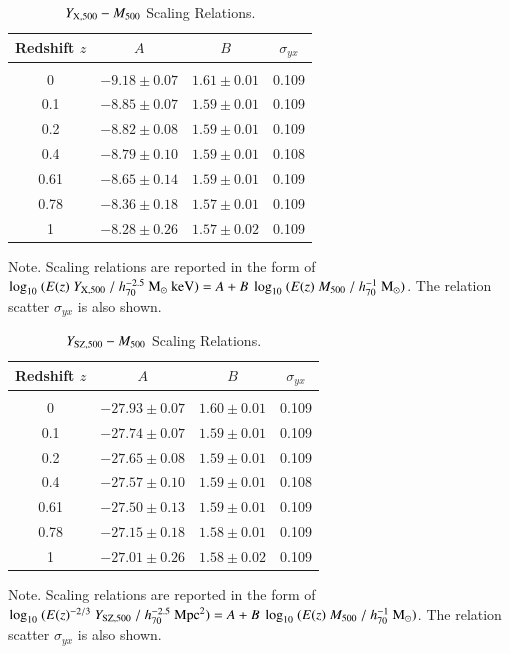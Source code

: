 \documentclass[traditabstract]{aa}
\newcommand{\rmn}{\mathrm}
\begin{document}
\begin{table}[t]
\begin{center}
\caption{$Y_{\rm{X}, 500}-M_{500}$ Scaling Relations.}
\medskip
\begin{tabular}{cccc}
\hline
\phantom{\Big|}
Redshift $z$ & $A$ & $B$ & $\sigma_{yx}$ \\
\hline\\[-0.5em]
 0      & $-9.18\pm0.07$ & $1.61\pm0.01$ & 0.109\\
 0.1   & $-8.85\pm0.07$ & $1.59\pm0.01$ & 0.109\\
 0.2   & $-8.82\pm0.08$ & $1.59\pm0.01$ & 0.109\\ 
 0.4   & $-8.79\pm0.10$ & $1.59\pm0.01$ & 0.108\\ 
 0.61 & $-8.65\pm0.14$ & $1.59\pm0.01$ & 0.109\\ 
 0.78 & $-8.36\pm0.18$ & $1.57\pm0.01$ & 0.109\\ 
 1      & $-8.28\pm0.26$ & $1.57\pm0.02$ & 0.109\\[0.5em]  
\hline
\end{tabular}
\label{tab:YXfits}
\end{center}
\footnotesize{Note. Scaling relations are reported in the form of $\log_{10}~(E(z)~Y_{\rm{X},500}~/~h_{70}^{-2.5}~\rmn{M_{\odot}}~\rmn{keV})=A+B~\log_{10}~(E(z)~M_{500}~/~h_{70}^{-1}~\rmn{M_{\odot}})$. The relation scatter $\sigma_{yx}$ is also shown.}
\end{table}

\begin{table}[t]
\begin{center}
\caption{$Y_{\rm{SZ}, 500}-M_{500}$ Scaling Relations.}
\medskip
\begin{tabular}{cccc}
\hline
\phantom{\Big|}
Redshift $z$ & $A$ & $B$ & $\sigma_{yx}$ \\
\hline\\[-0.5em]
 0      & $-27.93\pm0.07$ & $1.60\pm0.01$ & 0.109\\
 0.1   & $-27.74\pm0.07$ & $1.59\pm0.01$ & 0.109\\
 0.2   & $-27.65\pm0.08$ & $1.59\pm0.01$ & 0.109\\ 
 0.4   & $-27.57\pm0.10$ & $1.59\pm0.01$ & 0.108\\ 
 0.61 & $-27.50\pm0.13$ & $1.59\pm0.01$ & 0.109\\ 
 0.78 & $-27.15\pm0.18$ & $1.58\pm0.01$ & 0.109\\ 
 1      & $-27.01\pm0.26$ & $1.58\pm0.02$ & 0.109\\[0.5em] 
\hline
\end{tabular}
\label{tab:YSZfits}
\end{center}
\footnotesize{Note. Scaling relations are reported in the form of $\log_{10}~(E(z)^{-2/3}~Y_{\rm{SZ},500}~/~h_{70}^{-2.5}~\rmn{Mpc}^{2})=A+B~\log_{10}~(E(z)~M_{500}~/~h_{70}^{-1}~\rmn{M_{\odot}})$. The relation scatter $\sigma_{yx}$ is also shown.}
\end{table}
\end{document}
